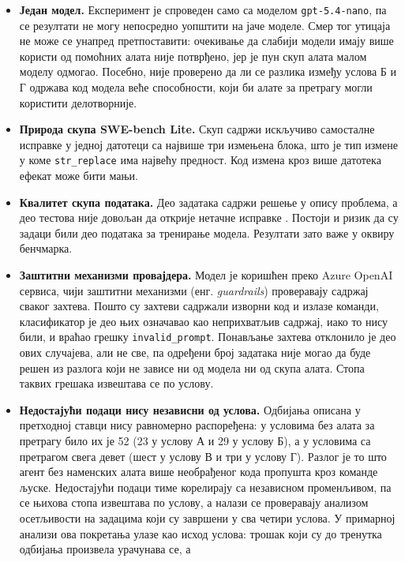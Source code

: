 \documentclass[12pt,a4paper]{report}
\begin{document}
	\begin{itemize}
		\item \textbf{Један модел.} Експеримент је спроведен само са моделом
		\texttt{gpt-5.4-nano}, па се резултати не могу непосредно уопштити на
		јаче моделе. Смер тог утицаја не може се унапред претпоставити:
		очекивање да слабији модели имају више користи од помоћних алата није
		потврђено, јер је пун скуп алата малом моделу одмогао.
		Посебно, није проверено да ли се разлика између услова Б и Г одржава
		код модела веће способности, који би алате за претрагу могли користити
		делотворније.
		\item \textbf{Природа скупа SWE-bench Lite.} Скуп садржи искључиво
		самосталне исправке у једној датотеци са највише три измењена блока, што
		је тип измене у коме \texttt{str\_replace} има највећу предност. Код
		измена кроз више датотека ефекат може бити мањи.
		\item \textbf{Квалитет скупа података.} Део задатака садржи решење у
		опису проблема, а део тестова није довољан да открије нетачне исправке
		\parencite{aleithan2024swebenchplus}. Постоји и ризик да су задаци били
		део података за тренирање модела. Резултати зато важе у оквиру
		бенчмарка.
		\item \textbf{Заштитни механизми провајдера.} Модел је коришћен преко
		Azure OpenAI сервиса, чији заштитни механизми (енг. \textit{guardrails})
		проверавају садржај сваког захтева. Пошто су захтеви садржали изворни
		код и излазе команди, класификатор је део њих означавао као неприхватљив
		садржај, иако то нису били, и враћао грешку \texttt{invalid\_prompt}.
		Понављање захтева отклонило је део ових случајева, али не све, па
		одређени број задатака није могао да буде решен из разлога који не
		зависе ни од модела ни од скупа алата. Стопа таквих грешака извештава се
		по услову.
		\item \textbf{Недостајући подаци нису независни од услова.} Одбијања
		описана у претходној ставци нису равномерно распоређена: у условима без
		алата за претрагу било их је 52 (23 у услову А и 29 у услову Б), а у
		условима са претрагом свега девет (шест у услову В и три у услову Г).
		Разлог је то што агент без наменских алата више необрађеног кода
		пропушта кроз команде љуске. Недостајући подаци тиме корелирају са
		независном променљивом, па се њихова стопа извештава по услову, а
		налази се проверавају анализом осетљивости на задацима који су завршени
		у сва четири услова. У примарној анализи ова покретања улазе као исход
		услова: трошак који су до тренутка одбијања произвела урачунава се, а

\end{itemize}
\end{document}
